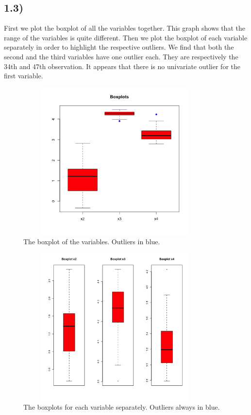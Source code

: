 \documentclass[a4paper,11pt,oneside]{report}
\begin{document}
\subsection*{1.3)}
	First we plot the boxplot of all the variables together. This graph shows that the range of the variables is quite different. Then we plot the boxplot of each variable separately in order to highlight the respective outliers.
	We find that both the second and the third variables have one outlier each. They are respectively the 34th and 47th observation. It appears that there is no univariate outlier for the first variable.
	\begin{figure}[H]
	\centering
	\includegraphics[width=10cm, height=8cm]{boxplot_same_scale.png}
	\caption{The boxplot of the variables. Outliers in blue.}
	\end{figure}
	\begin{figure}[H]
	\centering
	\includegraphics[width=10cm, height=8cm]{boxplots.png}
	\caption{The boxplots for each variable separately. Outliers always in blue.}
	\end{figure}
\end{document}
